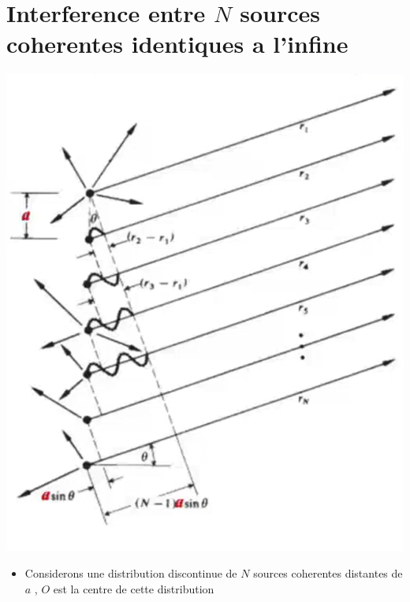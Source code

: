 \documentclass[12pt]{book}
\begin{document}
        \section{Interference entre $N$ sources coherentes identiques a l'infine}
            \begin{minipage}{0.59\linewidth}
                \includegraphics[width=\linewidth]{pic/diffraction3.png}
            \end{minipage}
            \begin{minipage}{0.39\linewidth}
                \begin{itemize}
                    \item Considerons une distribution discontinue de $N$ sources coherentes distantes de $a$ , $O$ est la centre de cette distribution 
                \end{itemize}
            \end{minipage}
\end{document}
